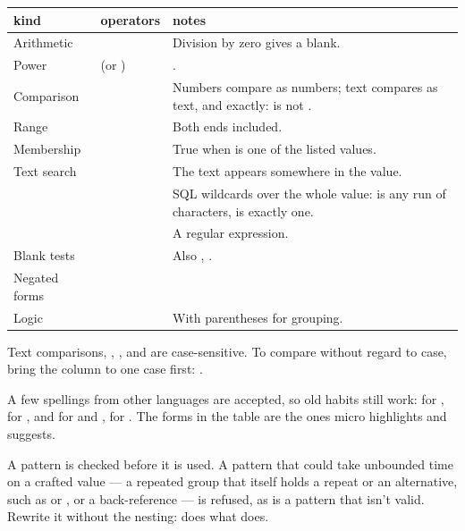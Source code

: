 \begin{tabularx}{\linewidth}{@{}p{26mm}p{42mm}L@{}}
\toprule
kind & operators & notes \\
\midrule
Arithmetic & \code{+} \; \code{-} \; \code{*} \; \code{/} & Division by zero gives a blank. \\
Power & \code{\textasciicircum{}} (or \code{**}) & . \\
Comparison & \code{=} \; \code{!=} \; \code{<} \; \code{<=} \; \code{>} \; \code{>=} & Numbers
  compare as numbers; text compares as text, and exactly:  is not
  . \\
Range &  & Both ends included. \\
Membership &  & True when  is one of the listed values. \\
Text search &  & The text appears somewhere in the value. \\
 &  & SQL wildcards over the whole value: \code{\%} is any run of
  characters, \code{\_} is exactly one. \\
 &  & A regular expression. \\
Blank tests &  \;  & Also ,
  . \\
Negated forms &  \;  \;  & \\
Logic &  \;  \;  & With parentheses for grouping. \\
\bottomrule
\end{tabularx}

Text comparisons, , ,  and  are case-sensitive. To
compare without regard to case, bring the column to one case first:
.

A few spellings from other languages are accepted, so old habits still work: \code{==} for
\code{=}, \code{<>} for \code{!=}, \code{\&\&} and \code{||} for  and ,
\code{\textasciitilde{}} for . The forms in the table are the ones micro highlights and suggests.

\begin{caution}
A  pattern is checked before it is used. A pattern that could take unbounded time on
a crafted value — a repeated group that itself holds a repeat or an alternative, such as
 or , or a back-reference — is refused, as is a pattern that isn't valid.
Rewrite it without the nesting: \code{[ab]*} does what  does.
\end{caution}

